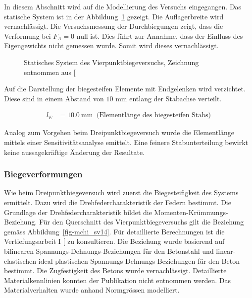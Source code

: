 \documentclass[
  11pt,
  letterpaper,
]{scrreprt}
\begin{document}
In diesem Abschnitt wird auf die Modellierung des Versuchs eingegangen.
Das statische System ist in der Abbildung~\ref{fig-system-SV14} gezeigt.
Die Auflagerbreite wird vernachlässigt. Die Versuchsmessung der
Durchbiegungen zeigt, dass die Verformung bei \(F_A = 0\) null ist. Dies
führt zur Annahme, dass der Einfluss des Eigengewichts nicht gemessen
wurde. Somit wird dieses vernachlässigt.

\begin{figure}[H]


\caption{\label{fig-system-SV14}Statisches System des
Vierpunktbiegeversuchs, Zeichnung entnommen aus
{[}\citeproc{ref-gitz_ansatze_2024}{1}{]}}

\end{figure}%

Auf die Darstellung der biegesteifen Elemente mit Endgelenken wird
verzichtet. Diese sind in einem Abstand von \(10\) mm entlang der
Stabachse verteilt.

$$
\begin{aligned}
l_{E} &= 10.0\ \mathrm{mm} \; \;\textrm{(Elementlänge des biegesteifen Stabs)}
\end{aligned}
$$

Analog zum Vorgehen beim Dreipunktbiegeversuch wurde die Elementlänge
mittels einer Sensitivitätsanalyse emittelt. Eine feinere
Stabunterteilung bewirkt keine aussagekräftige Änderung der Resultate.

\subsubsection{Biegeverformungen}\label{biegeverformungen-1}

Wie beim Dreipunktbiegeversuch wird zuerst die Biegesteifigkeit des
Systems ermittelt. Dazu wird die Drehfedercharakteristik der Federn
bestimmt. Die Grundlage der Drehfedercharakteristik bildet die
Momenten-Krümmungs-Beziehung. Für den Querschnitt des
Vierpunktbiegeversuchs gilt die Beziehung gemäss
Abbildung~\ref{fig-mchi_sv14}. Für detaillierte Berechnungen ist die
Vertiefungsarbeit I {[}\citeproc{ref-gitz_ansatze_2024}{1}{]} zu
konsultieren. Die Beziehung wurde basierend auf bilinearen
Spannungs-Dehnungs-Beziehungen für den Betonstahl und linear-elastischen
ideal-plastischen Spannungs-Dehnungs-Beziehungen für den Beton bestimmt.
Die Zugfestigkeit des Betons wurde vernachlässigt. Detaillierte
Materialkennlinien konnten der Publikation nicht entnommen werden. Das
Materialverhalten wurde anhand Normgrössen modelliert.
\end{document}
